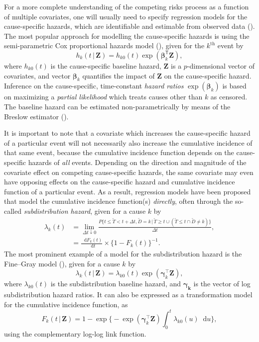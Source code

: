 \documentclass[
  letterpaper,
  paper=240mm:170mm,
  twoside=true,
  open=right,
  fontsize=10pt,
  pagesize=false,
  BCOR=15mm,
  DIV=14,
  headinclude=true,
  footinclude=false,
  headsepline=on]{scrbook}
\newcommand{\given}{\,|\,}
\newcommand\diff{\mathop{}\!\mathrm{d}}
\begin{document}
For a more complete understanding of the competing risks process as a
function of multiple covariates, one will usually need to specify
regression models for the cause-specific hazards, which are identifiable
and estimable from observed data
(). The most popular approach for modelling the cause-specific
hazards is using the semi-parametric Cox proportional hazards model
(), given for
the \(k^{\text{th}}\) event by \[
h_k(t \given \mathbf{Z}) = h_{k0}(t)\exp(\boldsymbol{\beta}_k^\mathsf{T} \mathbf{Z}),
\] where \(h_{k0}(t)\) is the cause-specific baseline hazard,
\(\mathbf{Z}\) is a \(p\)-dimensional vector of covariates, and vector
\(\boldsymbol{\beta}_k\) quantifies the impact of \(\mathbf{Z}\) on the
cause-specific hazard. Inference on the cause-specific, time-constant
\emph{hazard ratios} \(\exp(\boldsymbol{\beta}_k)\) is based on
maximizing a \emph{partial likelihood} which treats causes other than
\(k\) as censored. The baseline hazard can be estimated
non-parametrically by means of the Breslow estimator
().

It is important to note that a covariate which increases the
cause-specific hazard of a particular event will not necessarily also
increase the cumulative incidence of that same event, because the
cumulative incidence function depends on the cause-specific hazards of
\emph{all} events. Depending on the direction and magnitude of the
covariate effect on competing cause-specific hazards, the same covariate
may even have opposing effects on the cause-specific hazard and
cumulative incidence function of a particular event. As a result,
regression models have been proposed that model the cumulative incidence
function(s) \emph{directly}, often through the so-called
\emph{subdistribution hazard}, given for a cause \(k\) by \[
\begin{aligned}
    \lambda_k(t) &= \lim_{\Delta t \downarrow 0} \frac{P\{t \leq \tilde{T} < t + \Delta t, \tilde{D} = k \given \tilde{T} \geq t \cup (\tilde{T} \leq t \cap \tilde{D} \neq k)\}}{\Delta t}, \\
    &= \frac{\diff F_k(t)}{\diff t} \times \{1 - F_k(t)\}^{-1}.
\end{aligned}
\] The most prominent example of a model for the subdistribution hazard
is the Fine--Gray model
(),
given for a cause \(k\) by \[
\lambda_k(t \given \mathbf{Z}) = \lambda_{k0}(t)\exp(\boldsymbol{\gamma}_k^\intercal \mathbf{Z}),
\] where \(\lambda_{k0}(t)\) is the subdistribution baseline hazard, and
\(\boldsymbol{\gamma_k}\) is the vector of log subdistribution hazard
ratios. It can also be expressed as a transformation model for the
cumulative incidence function, as \[
F_k(t \given \mathbf{Z}) = 1 - \exp \Biggl\{ -\exp(\boldsymbol{\gamma}_k^\intercal \mathbf{Z}) \int_{0}^{t} \lambda_{k0}(u)\diff u \Biggr\},
\] using the complementary log-log link function.
\end{document}
